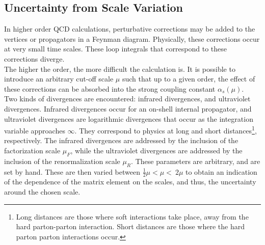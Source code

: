 \documentclass[11pt,a4paper]{report}
\begin{document}
\subsection{Uncertainty from Scale Variation}
In higher order QCD calculations, perturbative corrections may be added to the vertices or propagators in a Feynman diagram. Physically, these corrections occur at very small time scales. These loop integrals that correspond to these corrections diverge.\\
The higher the order, the more difficult the calculation is. It is possible to introduce an arbitrary cut-off scale $\mu$ such that up to a given order, the effect of these corrections can be absorbed into the strong coupling constant $\alpha_s(\mu)$.\\
Two kinds of divergences are encountered: infrared divergences, and ultraviolet divergences. Infrared divergences occur for an on-shell internal propagator, and ultraviolet divergences are logarithmic divergences that occur as the integration variable approaches $\infty$. They correspond to physics at long and short distances\footnote{Long distances are those where soft interactions take place, away from the hard parton-parton interaction. Short distances are those where the hard parton parton interactions occur.}, respectively. The infrared divergences are addressed by the inclusion of the factorization scale $\mu_F$, while the ultraviolet divergences are addressed by the inclusion of the renormalization scale $\mu_R$. These parameters are arbitrary, and are set by hand. These are then varied between $\frac{1}{2}\mu < \mu < \ 2\mu$ to obtain an indication of the dependence of the matrix element on the scales, and thus, the uncertainty around the chosen scale. 
\end{document}
